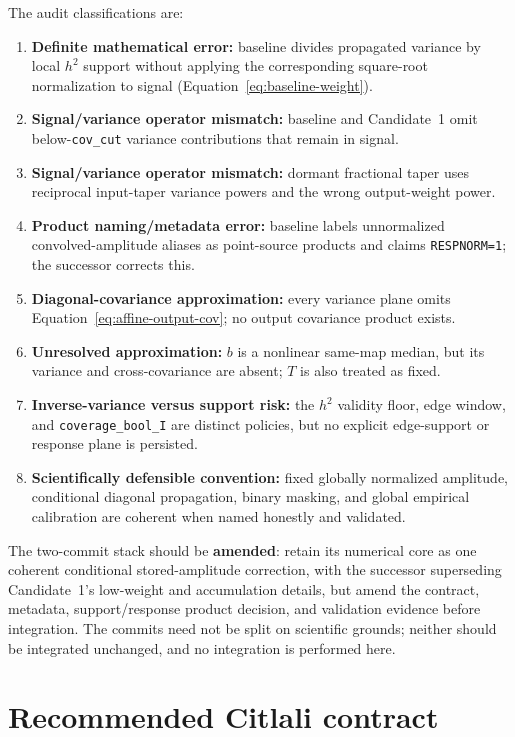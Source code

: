 \documentclass[11pt]{article}
\newcommand{\code}[1]{\nolinkurl{#1}}
\begin{document}
The audit classifications are:
\begin{enumerate}
\item \textbf{Definite mathematical error:} baseline divides propagated
variance by local $h^2$ support without applying the corresponding
square-root normalization to signal
(Equation~\eqref{eq:baseline-weight}).
\item \textbf{Signal/variance operator mismatch:} baseline and Candidate~1
omit below-\code{cov_cut} variance contributions that remain in signal.
\item \textbf{Signal/variance operator mismatch:} dormant fractional taper
uses reciprocal input-taper variance powers and the wrong output-weight power.
\item \textbf{Product naming/metadata error:} baseline labels unnormalized
convolved-amplitude aliases as point-source products and claims
\code{RESPNORM=1}; the successor corrects this.
\item \textbf{Diagonal-covariance approximation:} every variance plane omits
Equation~\eqref{eq:affine-output-cov}; no output covariance product exists.
\item \textbf{Unresolved approximation:} $b$ is a nonlinear same-map median,
but its variance and cross-covariance are absent; $T$ is also treated as fixed.
\item \textbf{Inverse-variance versus support risk:} the $h^2$ validity floor,
edge window, and \code{coverage_bool_I} are distinct policies, but no explicit
edge-support or response plane is persisted.
\item \textbf{Scientifically defensible convention:} fixed globally
normalized amplitude, conditional diagonal propagation, binary masking, and
global empirical calibration are coherent when named honestly and validated.
\end{enumerate}

The two-commit stack should be \textbf{amended}: retain its numerical core as
one coherent conditional stored-amplitude correction, with the successor
superseding Candidate~1's low-weight and accumulation details, but amend the
contract, metadata, support/response product decision, and validation evidence
before integration.  The commits need not be split on scientific grounds;
neither should be integrated unchanged, and no integration is performed here.

\section{Recommended Citlali contract}
\label{sec:recommendation}
\end{document}
